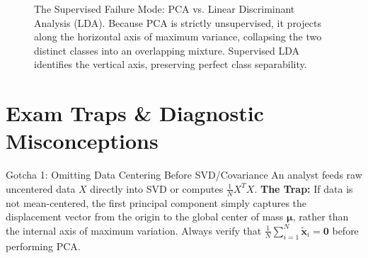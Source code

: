 \begin{figure}[htbp]
\centering
{}
\caption{The Supervised Failure Mode: PCA vs. Linear Discriminant Analysis (LDA). Because PCA is strictly unsupervised, it projects along the horizontal axis of maximum variance, collapsing the two distinct classes into an overlapping mixture. Supervised LDA identifies the vertical axis, preserving perfect class separability.}
\label{fig:pca_vs_lda}
\end{figure}

\section{Exam Traps \& Diagnostic Misconceptions}

\begin{trapbox}{Gotcha 1: Omitting Data Centering Before SVD/Covariance}
An analyst feeds raw uncentered data $X$ directly into SVD or computes $\frac{1}{N}X^T X$.
\textbf{The Trap:} If data is not mean-centered, the first principal component simply captures the displacement vector from the origin to the global center of mass $\boldsymbol{\mu}$, rather than the internal axis of maximum variation. Always verify that $\frac{1}{N}\sum_{i=1}^N \tilde{\mathbf{x}}_i = \mathbf{0}$ before performing PCA.
\end{trapbox}

